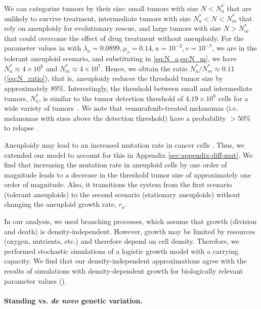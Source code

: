 \documentclass[12pt]{extarticle}
\renewcommand{\Delta}{r}
\begin{document}
We can categorize tumors by their size: small tumors with size $N<N_a^*$ that are unlikely to survive treatment, intermediate tumors with size $N_a^* < N < N_m^*$ that rely on aneuploidy for evolutionary rescue, and large tumors with size $N > N_m^*$ that could overcome the effect of drug treatment without aneuploidy.
For the parameter values in  with $\lambda_a=0.0899,\mu_s=0.14, u=10^{-2}, v=10^{-7}$, we are in the tolerant aneuploid scenario, and substituting in \cref{eq:N_a,eq:N_m}, we have $N_a^* \approx 4 \times 10^6$ and $N_m^* \approx 4 \times 10^7$.
Hence, we obtain the ratio $N^*_a/N^*_m \approx 0.11$ (\cref{eq:N_ratio}), that is, aneuploidy reduces the threshold tumor size by approximately 89\%.
Interestingly, the threshold between small and intermediate tumors, $N_a^*$, is similar to the tumor detection threshold of $4.19 \times 10^6$ cells for a wide variety of tumors~\citep{avanzini2019cancer}. We note that vemurafenib-treated melanomas (i.e. melanomas with sizes above the detection threshold) have a probability $>50\%$ to relapse \citep{piejko2023long,handa2022long}. %

Aneuploidy may lead to an increased mutation rate in cancer cells \citep{garribba2023short,passerini2016presence,janssen2011chromosome}. Thus, we extended our model to account for this in Appendix \ref{sec:appendix-diff-mut}. We find that increasing the mutation rate in aneuploid cells by one order of magnitude leads to a decrease in the threshold tumor size of approximately one order of magnitude. Also, it transitions the system from the first scenario (tolerant aneuploids) to the second scenario (stationary aneuploids) without changing the aneuploid growth rate, $\Delta_a$. %

In our analysis, we used branching processes, which assume that growth (division and death) is density-independent. However, growth may be limited by resources (oxygen, nutrients, etc.) and therefore depend on cell density. 
Therefore, we performed stochastic simulations of a logistic growth model with a carrying capacity. 
We find that our density-independent approximations agree with the results of simulations with density-dependent growth for biologically relevant parameter values ().

\paragraph*{Standing vs. \textit{de novo} genetic variation.}
\end{document}
